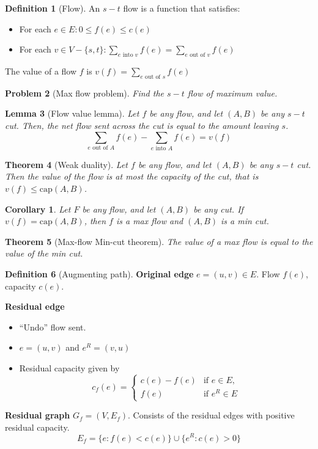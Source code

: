 \documentclass[10pt, oneside, reqno]{amsart}
\theoremstyle{plain}%
\newtheorem{thm}{Theorem}[section]
\newtheorem{prob}[thm]{Problem}
\newtheorem{lem}[thm]{Lemma}
\newtheorem*{cor}{Corollary}
\theoremstyle{definition}
\newtheorem{defn}[thm]{Definition}
\theoremstyle{remark}
\begin{document}
\begin{defn}[Flow]
    An $s-t$ flow is a function that satisfies:
    \begin{itemize}
        \item For each $e \in E: 0 \leq f(e) \leq c(e)$
        \item For each $v \in V - \{s,t\}:  \displaystyle \sum_{\text{$e$ into $v$}}f(e)  = \displaystyle \sum_{\text{$e$ out of  $v$}}f(e)$
    \end{itemize}
    
    The value of a flow $f$ is $v(f) = \displaystyle \sum_{\text{$e$ out of $s$}}f(e)$
\end{defn}

\begin{prob}[Max flow problem]
    Find the $s-t$ flow of maximum value.
\end{prob}

\newcommand{\sumsub}[1]{\displaystyle\sum_{\text{#1}}}
\begin{lem}[Flow value lemma]
    Let $f$ be any flow, and let $(A,B)$ be any $s-t$ cut.  Then, the net flow sent across the cut is equal to the amount leaving $s$.\[
        \sumsub{$e$ out of $A$} f(e) - \sumsub{$e$ into $A$}f(e) = v(f)
    \]
\end{lem}


\begin{thm}[Weak duality]
    Let $f$ be any flow, and let $(A,B)$ be any $s-t$ cut.  Then the value of the flow is at most the capacity of the cut, that is $v(f) \leq \text{cap}(A,B)$. 
\end{thm}

\begin{cor}
    Let $F$ be any flow, and let $(A,B)$ be any cut.  If $v(f) = \text{cap}(A,B)$, then $f$ is a max flow and $(A,B)$ is a min cut.
\end{cor}

\begin{thm}[Max-flow Min-cut theorem]
    The value of a max flow is equal to the value of the min cut.
\end{thm}

    
\begin{defn}[Augmenting path]
    \textbf{Original edge} $e = (u,v) \in E$.  Flow $f(e)$, capacity $c(e)$.
    
    \textbf{Residual edge}
    \begin{itemize}
        \item ``Undo'' flow sent. 
        \item $e = (u,v)$ and $e^R = (v,u)$
        \item Residual capacity given by \[
            c_f(e) = \begin{cases}
                c(e) - f(e) &\text{if $e \in E$},\\
                f(e)        &\text{if $e^R \in E$}
            \end{cases}
        \]
    \end{itemize}
    
    \textbf{Residual graph} $G_f = (V, E_f)$.  Consists of the residual edges with positive residual capacity.\[
        E_f = \{ e:f(e) < c(e)\} \cup \{ e^R : c(e) > 0\}
    \]
\end{defn}  
    
\end{document}
